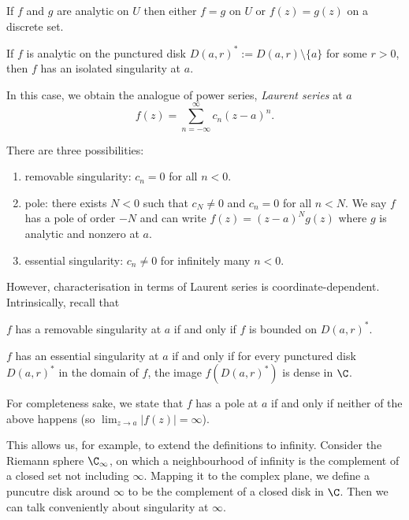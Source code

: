 \documentclass[a4paper]{article}
\begin{document}
\begin{corollary}
  If \(f\) and \(g\) are analytic on \(U\) then either \(f = g\) on \(U\) or \(f(z) = g(z)\) on a discrete set.
\end{corollary}

\begin{definition}
  If \(f\) is analytic on the punctured disk \(D(a, r)^* := D(a, r) \setminus \{a\}\) for some \(r > 0\), then \(f\) has an isolated singularity at \(a\).
\end{definition}

In this case, we obtain the analogue of power series, \emph{Laurent series} at \(a\)
\[
  f(z) = \sum_{n = -\infty}^{\infty} c_n (z - a)^n.
\]

There are three possibilities:
\begin{enumerate}
\item removable singularity: \(c_n = 0\) for all \(n < 0\).
\item pole: there exists \(N < 0\) such that \(c_N \neq 0\) and \(c_n = 0\) for all \(n < N\). We say \(f\) has a pole of order \(-N\) and can write \(f(z) = (z - a)^N g(z)\) where \(g\) is analytic and nonzero at \(a\).
\item essential singularity: \(c_n \neq 0\) for infinitely many \(n < 0\).
\end{enumerate}

However, characterisation in terms of Laurent series is coordinate-dependent. Intrinsically, recall that

\begin{theorem}
  \(f\) has a removable singularity at \(a\) if and only if \(f\) is bounded on \(D(a, r)^*\).
\end{theorem}

\begin{theorem}
  \(f\) has an essential singularity at \(a\) if and only if for every punctured disk \(D(a, r)^*\) in the domain of \(f\), the image \(f(D(a, r)^*)\) is dense in \(\C\).
\end{theorem}

For completeness sake, we state that \(f\) has a pole at \(a\) if and only if neither of the above happens (so \(\lim_{z \to a} |f(z)| = \infty\)).

This allows us, for example, to extend the definitions to infinity. Consider the Riemann sphere \(\C_\infty\), on which a neighbourhood of infinity is the complement of a closed set not including \(\infty\). Mapping it to the complex plane, we define a puncutre disk around \(\infty\) to be the complement of a closed disk in \(\C\). Then we can talk conveniently about singularity at \(\infty\).
\end{document}

